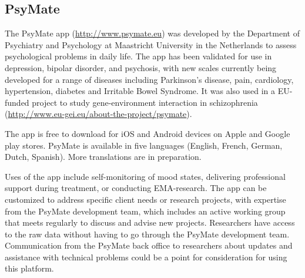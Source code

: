 \documentclass[]{book}
\begin{document}
\subsection{PsyMate}\label{psymate}


The PsyMate app (\url{http://www.psymate.eu}) was developed by the
Department of Psychiatry and Psychology at Maastricht University in the
Netherlands to assess psychological problems in daily life. The app has
been validated for use in depression, bipolar disorder, and psychosis,
with new scales currently being developed for a range of diseases
including Parkinson's disease, pain, cardiology, hypertension, diabetes
and Irritable Bowel Syndrome. It was also used in a EU-funded project to
study gene-environment interaction in schizophrenia
(\url{http://www.eu-gei.eu/about-the-project/psymate}).

The app is free to download for iOS and Android devices on Apple and
Google play stores. PsyMate is available in five languages (English,
French, German, Dutch, Spanish). More translations are in preparation.

Uses of the app include self-monitoring of mood states, delivering
professional support during treatment, or conducting EMA-research. The
app can be customized to address specific client needs or research
projects, with expertise from the PsyMate development team, which
includes an active working group that meets regularly to discuss and
advise new projects. Researchers have access to the raw data without
having to go through the PsyMate development team. Communication from
the PsyMate back office to researchers about updates and assistance with
technical problems could be a point for consideration for using this
platform.
\end{document}
